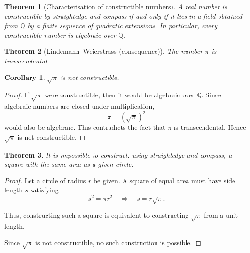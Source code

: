\documentclass{article}
\newtheorem*{theorem}{Theorem}
\newtheorem*{corollary}{Corollary}
\begin{document}
\begin{theorem}[Characterisation of constructible numbers]
    A real number is constructible by straightedge and compass if and only if it lies in a field obtained from $\mathbb{Q}$ by 
    a finite sequence of quadratic extensions. In particular, every constructible number is algebraic over $\mathbb{Q}$.
\end{theorem}

\begin{theorem}[Lindemann--Weierstrass (consequence)]
    The number $\pi$ is transcendental.
\end{theorem}

\begin{corollary}
    $\sqrt{\pi}$ is not constructible.
\end{corollary}

\begin{proof}
    If $\sqrt{\pi}$ were constructible, then it would be algebraic over $\mathbb{Q}$. 
    Since algebraic numbers are closed under multiplication,
    \[
    \pi = (\sqrt{\pi})^2
    \]
    would also be algebraic. This contradicts the fact that $\pi$ is transcendental. Hence $\sqrt{\pi}$ is not constructible.
\end{proof}

\begin{theorem}
    It is impossible to construct, using straightedge and compass, a square with the same area as a given circle.
\end{theorem}

\begin{proof}
    Let a circle of radius $r$ be given. A square of equal area must have side length $s$ satisfying
    \[
    s^2 = \pi r^2 \quad \Rightarrow \quad s = r\sqrt{\pi}.
    \]

    Thus, constructing such a square is equivalent to constructing $\sqrt{\pi}$ from a unit length.

    Since $\sqrt{\pi}$ is not constructible, no such construction is possible.
\end{proof}
\end{document}
